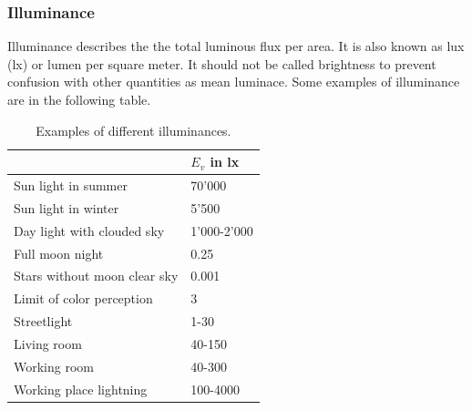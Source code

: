 \subsubsection{Illuminance}
Illuminance describes the the total luminous flux per area. It is also known as lux (lx) or lumen per square meter.
It should not be called brightness to prevent confusion with other quantities as mean luminace.
Some examples of illuminance are in the following table.
\begin{table}[ht]
\begin{tabular}{ |p{11cm} |p{3cm}|  }
	\hline
	& $E_v$ in lx\\
		
	\hline
	Sun light in summer					& 70'000\\
	Sun light in winter					& 5'500\\
	Day light with clouded sky			& 1'000-2'000\\
	Full moon night						& 0.25\\
	Stars without moon clear sky		& 0.001\\
	Limit of color perception			& 3\\
	Streetlight							& 1-30\\
	Living room							& 40-150\\
	Working room						& 40-300\\
	Working place lightning				& 100-4000\\
	
	\hline
\end{tabular}
\caption{Examples of different illuminances.\label{theory:illuminance}}	
\end{table}


%		


